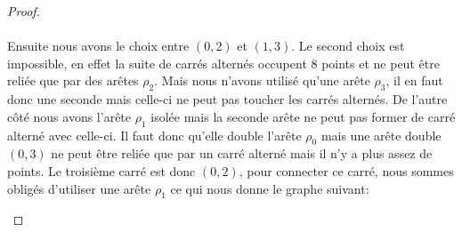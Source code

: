 \begin{proof}
  \paragraph{}
  Ensuite nous avons le choix entre $(0,2)$ et $(1,3)$. Le second choix est impossible, en effet la suite de carrés alternés occupent 8 points et ne peut être reliée que par des arêtes $\rho_2$. Mais nous n'avons utilisé qu'une arête $\rho_3$, il en faut donc une seconde mais celle-ci ne peut pas toucher les carrés alternés. De l'autre côté nous avons l'arête $\rho_1$ isolée mais la seconde arête ne peut pas former de carré alterné avec celle-ci. Il faut donc qu'elle double l'arête $\rho_0$ mais une arête double $(0,3)$ ne peut être reliée que par un carré alterné mais il n'y a plus assez de points. Le troisième carré est donc $(0,2)$, pour connecter ce carré, nous sommes obligés d'utiliser une arête $\rho_1$ ce qui nous donne le graphe suivant:


  \begin{figure}[H]
    \begin{center}
\end{center}
\end{figure}
\end{proof}
